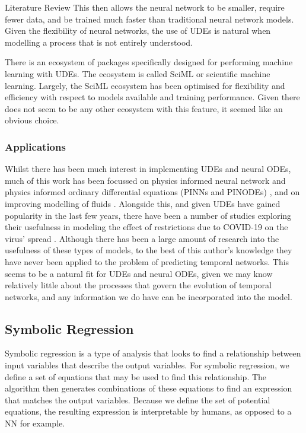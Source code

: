\documentclass[12pt]{amsart}
\begin{document}
\begin{section}{Literature Review}
            This then allows the neural network to be smaller, require fewer data, and be trained much faster than traditional neural network models. Given the flexibility of neural networks, the use of UDEs is natural when modelling a process that is not entirely understood\cite{kidger2022neural}.
            
            There is an ecosystem of packages specifically designed for performing machine learning with UDEs. The ecosystem is called SciML or scientific machine learning\cite{SciML_C_Rak}. Largely, the SciML ecosystem has been optimised for flexibility and efficiency with respect to models available and training performance. Given there does not seem to be any other ecosystem with this feature, it seemed like 
            an obvious choice.
        
        \subsubsection{Applications}
            Whilst there has been much interest in implementing UDEs and neural ODEs, much of this work has been focussed on physics informed neural network and physics informed ordinary differential equations (PINNs and PINODEs) \cite{karniadakis2021physics,GAO2021110079,krishnapriyan2021characterizing,roehrl2020modeling}, and on improving modelling of fluids \cite{mahmoudabadbozchelou2021data,nguyen2022physics}. Alongside this, and given UDEs have gained popularity in the last few years, there have been a number of studies exploring their usefulness in modeling the effect of restrictions due to COVID-19 on the virus' spread \cite{Dandekar2020.04.03.20052084}. Although there has been a large amount of research into the usefulness of these types of models, to the best of this author's knowledge they have never been applied to the problem of predicting temporal networks. This seems to be a natural fit for UDEs and neural ODEs, given we may know relatively little about the processes that govern the evolution of temporal networks, and any information we do have can be incorporated into the model.

    \subsection{Symbolic Regression}
        Symbolic regression is a type of analysis that looks to find a relationship between input variables that describe the output variables. For symbolic regression, we define a set of equations that may be used to find this relationship. The algorithm then generates combinations of these equations to find an expression that matches the output variables. Because we define the set of potential equations, the resulting expression is interpretable by humans, as opposed to a NN for example. 


\end{section}
\end{document}
